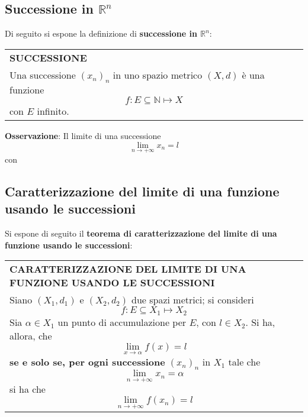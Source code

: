 \documentclass[a4paper]{extarticle}
\renewcommand\arraystretch{}
\begin{document}
\vspace{1em}
\noindent
\subsection{Successione in $\mathbb{R}^n$}
Di seguito si espone la definizione di \textbf{successione in $\mathbb{R}^n$}:

\vspace{1em}
\setlength{\tabcolsep}{14pt}
\renewcommand{\arraystretch}{2}
\noindent
\begin{tabularx}{\textwidth}{@{}|P|@{}}
    \hline
    {\textbf{SUCCESSIONE}}\\
    \parbox{\linewidth}{Una successione $(x_n)_n$ in uno spazio metrico $(X,d)$ è una funzione
    \[f : E \subseteq \mathbb{N} \longmapsto X\]
    con $E$ infinito.
    \vspace{3mm}}\\
    \hline
\end{tabularx}

\vspace{2em}
\noindent
\textbf{Osservazione}: Il limite di una successione
\[\lim_{n \to +\infty} x_n = l\]
con 

\vspace{2em}
\noindent
\subsection{Caratterizzazione del limite di una funzione usando le successioni}
Si espone di seguito il \textbf{teorema di caratterizzazione del limite di una funzione usando le successioni}:

\vspace{1em}
\setlength{\tabcolsep}{14pt}
\renewcommand{\arraystretch}{2}
\noindent
\begin{tabularx}{\textwidth}{@{}|P|@{}}
    \hline
    {\textbf{CARATTERIZZAZIONE DEL LIMITE DI UNA FUNZIONE USANDO LE SUCCESSIONI}}\\
    \parbox{\linewidth}{Siano $(X_1,d_1)$ e $(X_2,d_2)$ due spazi metrici; si consideri
    \[f : E \subseteq X_1 \longmapsto X_2\]
    Sia $\alpha \in X_1$ un punto di accumulazione per $E$, con $l \in X_2$. Si ha, allora, che
    \[\lim_{x \to \alpha} f(x) = l\]
    \textbf{se e solo se, per ogni successione} $(x_n)_n$ in $X_1$ tale che
    \[\lim_{n \to +\infty} x_n = \alpha\]
    si ha che
    \[\lim_{n \to +\infty} f(x_n) = l\]
    \vspace{-1mm}}\\
    \hline
\end{tabularx}
\end{document}
